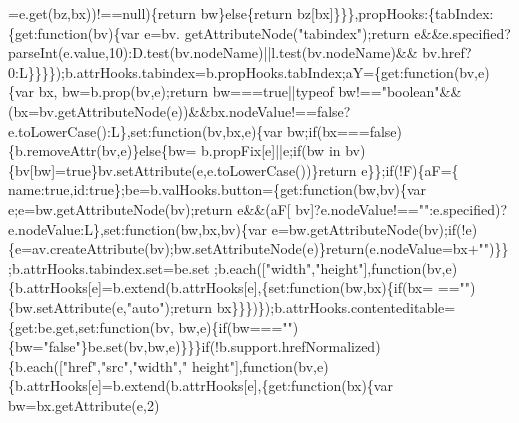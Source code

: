 \begin{DoxyCode}
      =e.get(bz,bx))!==null)\{\textcolor{keywordflow}{return} bw\}\textcolor{keywordflow}{else}\{\textcolor{keywordflow}{return} bz[bx]\}\}\},propHooks:\{tabIndex:\{\textcolor{keyword}{get}:\textcolor{keyword}{function}(bv)\{var e=bv.
      getAttributeNode(\textcolor{stringliteral}{"tabindex"});\textcolor{keywordflow}{return} e&&e.specified?parseInt(e.value,10):D.test(bv.nodeName)||l.test(bv.nodeName)&&
      bv.href?0:L\}\}\}\});b.attrHooks.tabindex=b.propHooks.tabIndex;aY=\{\textcolor{keyword}{get}:\textcolor{keyword}{function}(bv,e)\{var bx,
      bw=b.prop(bv,e);\textcolor{keywordflow}{return} bw===\textcolor{keyword}{true}||typeof bw!==\textcolor{stringliteral}{"boolean"}&&(bx=bv.getAttributeNode(e))&&bx.nodeValue!==\textcolor{keyword}{false}?
      e.toLowerCase():L\},\textcolor{keyword}{set}:\textcolor{keyword}{function}(bv,bx,e)\{var bw;\textcolor{keywordflow}{if}(bx===\textcolor{keyword}{false})\{b.removeAttr(bv,e)\}\textcolor{keywordflow}{else}\{bw=
      b.propFix[e]||e;\textcolor{keywordflow}{if}(bw in bv)\{bv[bw]=\textcolor{keyword}{true}\}bv.setAttribute(e,e.toLowerCase())\}\textcolor{keywordflow}{return} e\}\};\textcolor{keywordflow}{if}(!F)\{aF=\{
      name:\textcolor{keyword}{true},\textcolor{keywordtype}{id}:\textcolor{keyword}{true}\};be=b.valHooks.button=\{\textcolor{keyword}{get}:\textcolor{keyword}{function}(bw,bv)\{var e;e=bw.getAttributeNode(bv);\textcolor{keywordflow}{return} e&&(aF[
      bv]?e.nodeValue!==\textcolor{stringliteral}{""}:e.specified)?e.nodeValue:L\},\textcolor{keyword}{set}:\textcolor{keyword}{function}(bw,bx,bv)\{var e=bw.getAttributeNode(bv);\textcolor{keywordflow}{if}(!e)
      \{e=av.createAttribute(bv);bw.setAttributeNode(e)\}\textcolor{keywordflow}{return}(e.nodeValue=bx+\textcolor{stringliteral}{""})\}\};b.attrHooks.tabindex.set=be.set
      ;b.each([\textcolor{stringliteral}{"width"},\textcolor{stringliteral}{"height"}],\textcolor{keyword}{function}(bv,e)\{b.attrHooks[e]=b.extend(b.attrHooks[e],\{set:function(bw,bx)\{if(bx=
      ==\textcolor{stringliteral}{""})\{bw.setAttribute(e,\textcolor{stringliteral}{"auto"});return bx\}\}\})\});b.attrHooks.contenteditable=\{\textcolor{keyword}{get}:be.get,\textcolor{keyword}{set}:\textcolor{keyword}{function}(bv,
      bw,e)\{\textcolor{keywordflow}{if}(bw===\textcolor{stringliteral}{""})\{bw=\textcolor{stringliteral}{"false"}\}be.set(bv,bw,e)\}\}\}\textcolor{keywordflow}{if}(!b.support.hrefNormalized)\{b.each([\textcolor{stringliteral}{"href"},\textcolor{stringliteral}{"src"},\textcolor{stringliteral}{"width"},\textcolor{stringliteral}{"
      height"}],\textcolor{keyword}{function}(bv,e)\{b.attrHooks[e]=b.extend(b.attrHooks[e],\{get:function(bx)\{var bw=bx.getAttribute(e,2)

\end{DoxyCode}
